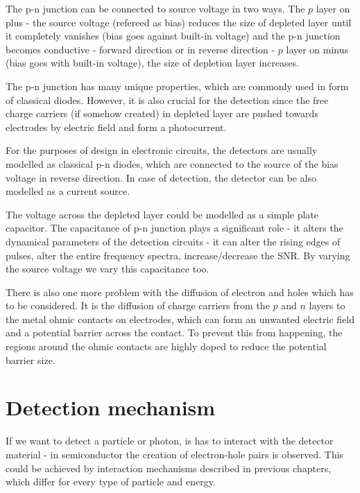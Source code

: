 \par
The p-n junction can be connected to source voltage in two ways. The $p$ layer on plus - the source voltage (refereed as bias) reduces the size of depleted layer until it completely vanishes (bias goes against built-in voltage) and the p-n junction becomes conductive - forward direction or in reverse direction - $p$ layer on minus (bias goes with built-in voltage), the size of depletion layer increases.


\par
The p-n junction has many unique properties, which are commonly used in form of classical diodes. However, it is also crucial for the detection since the free charge carriers (if somehow created) in depleted layer are pushed towards electrodes by electric field and form a photocurrent.

\par
For the purposes of design in electronic circuits, the detectors are usually modelled as classical p-n diodes, which are connected to the source of the bias voltage in reverse direction. In case of detection, the detector can be also modelled as a current source.


\par
The voltage across the depleted layer could be modelled as a simple plate capacitor. The capacitance of p-n junction plays a significant role - it alters the dynamical parameters of the detection circuits - it can alter the rising edges of pulses, alter the entire frequency spectra, increase/decrease the SNR. By varying the source voltage we vary this capacitance too.

\par
There is also one more problem with the diffusion of electron and holes which has to be considered. It is the diffusion of charge carriers from the $p$ and $n$ layers to the metal ohmic contacts on electrodes, which can form an unwanted electric field and a potential barrier across the contact. To prevent this from happening, the regions around the ohmic contacts are highly doped to reduce the potential barrier size. 


\section{Detection mechanism}

\par
If we want to detect a particle or photon, is has to interact with the detector material - in semiconductor the creation of electron-hole pairs is observed. This could be achieved by interaction mechanisms described in previous chapters, which differ for every type of particle and energy. 

